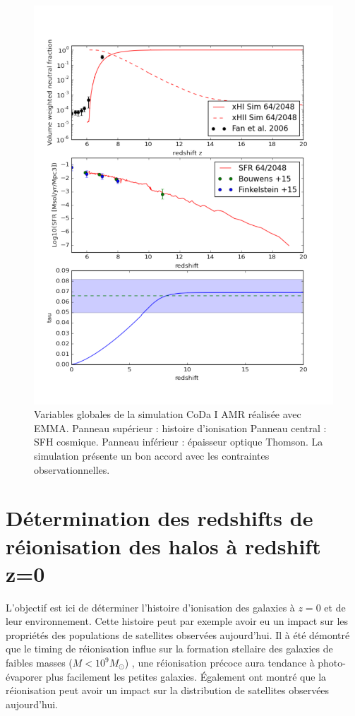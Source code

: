 \begin{figure}
        \includegraphics[width=.95\linewidth]{img/05/x_sfr_tau.pdf} 
        \caption[Contraintes CoDa I AMR]{ Variables globales de la simulation \ac{CoDa} I \ac{AMR} réalisée avec EMMA.
        Panneau supérieur : histoire d'ionisation
		Panneau central : SFH cosmique.
        Panneau inférieur : épaisseur optique Thomson.
        La simulation présente un bon accord avec les contraintes observationnelles.
		\label{fig:presCODAEMMA}}
\end{figure}


\section{Détermination des redshifts de réionisation des halos à redshift z=0}

L'objectif est ici de déterminer l'histoire d'ionisation des galaxies à $z=0$ et de leur environnement.
Cette histoire peut par exemple avoir eu un impact sur les propriétés des populations de satellites observées aujourd'hui.
Il à été démontré que le timing de réionisation influe sur la formation stellaire des galaxies de faibles masses ($M<10^9M_\odot$) \citep{ocvirk_reionization_2014}, une réionisation précoce aura tendance à photo-évaporer plus facilement les petites galaxies.
Également \citep{2015ApJ...800...34G} ont montré que la réionisation peut avoir un impact sur la distribution de satellites observées aujourd'hui.

